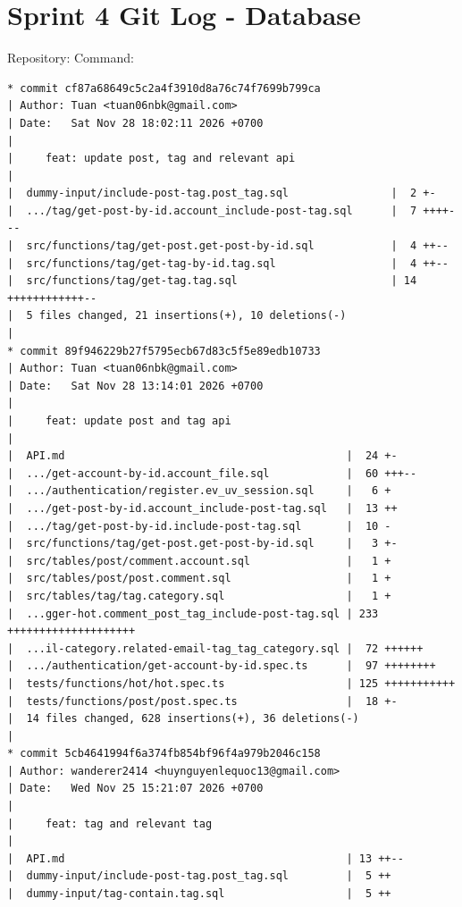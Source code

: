 \documentclass[12pt]{article}
\begin{document}

\section{Sprint 4 Git Log - Database}

Repository: \texttt{} Command: \texttt{}

\begin{lstlisting}[numbers=none,breaklines=true]
* commit cf87a68649c5c2a4f3910d8a76c74f7699b799ca
| Author: Tuan <tuan06nbk@gmail.com>
| Date:   Sat Nov 28 18:02:11 2026 +0700
|
|     feat: update post, tag and relevant api
|
|  dummy-input/include-post-tag.post_tag.sql                |  2 +-
|  .../tag/get-post-by-id.account_include-post-tag.sql      |  7 ++++---
|  src/functions/tag/get-post.get-post-by-id.sql            |  4 ++--
|  src/functions/tag/get-tag-by-id.tag.sql                  |  4 ++--
|  src/functions/tag/get-tag.tag.sql                        | 14 ++++++++++++--
|  5 files changed, 21 insertions(+), 10 deletions(-)
|
* commit 89f946229b27f5795ecb67d83c5f5e89edb10733
| Author: Tuan <tuan06nbk@gmail.com>
| Date:   Sat Nov 28 13:14:01 2026 +0700
|
|     feat: update post and tag api
|
|  API.md                                            |  24 +-
|  .../get-account-by-id.account_file.sql            |  60 +++--
|  .../authentication/register.ev_uv_session.sql     |   6 +
|  .../get-post-by-id.account_include-post-tag.sql   |  13 ++
|  .../tag/get-post-by-id.include-post-tag.sql       |  10 -
|  src/functions/tag/get-post.get-post-by-id.sql     |   3 +-
|  src/tables/post/comment.account.sql               |   1 +
|  src/tables/post/post.comment.sql                  |   1 +
|  src/tables/tag/tag.category.sql                   |   1 +
|  ...gger-hot.comment_post_tag_include-post-tag.sql | 233 ++++++++++++++++++++
|  ...il-category.related-email-tag_tag_category.sql |  72 ++++++
|  .../authentication/get-account-by-id.spec.ts      |  97 ++++++++
|  tests/functions/hot/hot.spec.ts                   | 125 +++++++++++
|  tests/functions/post/post.spec.ts                 |  18 +-
|  14 files changed, 628 insertions(+), 36 deletions(-)
|
* commit 5cb4641994f6a374fb854bf96f4a979b2046c158
| Author: wanderer2414 <huynguyenlequoc13@gmail.com>
| Date:   Wed Nov 25 15:21:07 2026 +0700
|
|     feat: tag and relevant tag
|
|  API.md                                            | 13 ++--
|  dummy-input/include-post-tag.post_tag.sql         |  5 ++
|  dummy-input/tag-contain.tag.sql                   |  5 ++

\end{lstlisting}
\end{document}
